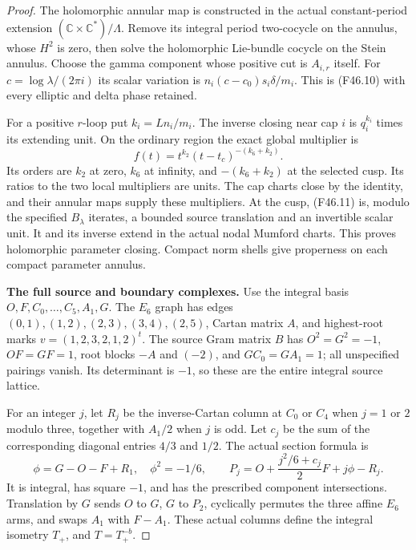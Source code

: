 \begin{proof}
The holomorphic annular map is constructed in the actual
constant-period extension $(\mathbb C\times\mathbb C^*)/\Lambda$.
Remove its integral period two-cocycle on the annulus, whose
$H^2$ is zero, then solve the holomorphic Lie-bundle cocycle
on the Stein annulus. Choose the gamma component whose positive
cut is $A_{i,r}$ itself. For $c=\log\lambda/(2\pi i)$ its scalar
variation is $n_i(c-c_0)s_i\delta/m_i$. This is (F46.10) with
every elliptic and delta phase retained.

For a positive $r$-loop put $k_i=Ln_i/m_i$. The inverse closing
near cap $i$ is $q_i^{k_i}$ times its extending unit. On the
ordinary region the exact global multiplier is
\[
                  f(t)=t^{k_2}(t-t_c)^{-(k_6+k_2)}.              \tag{F46.11}
\]
Its orders are $k_2$ at zero, $k_6$ at infinity, and
$-(k_6+k_2)$ at the selected cusp. Its ratios to the two local
multipliers are units. The cap charts close by the identity,
and their annular maps supply these multipliers. At the cusp,
(F46.11) is, modulo the specified $B_\lambda$ iterates, a bounded
source translation and an invertible scalar unit. It and its
inverse extend in the actual nodal Mumford charts. This proves
holomorphic parameter closing. Compact norm shells give
properness on each compact parameter annulus.

\par\medskip\noindent\textbf{The full source and boundary complexes.}
Use the integral basis $O,F,C_0,\ldots,C_5,A_1,G$.
The $E_6$ graph has edges
$(0,1),(1,2),(2,3),(3,4),(2,5)$, Cartan matrix $A$, and
highest-root marks $v=(1,2,3,2,1,2)^t$.
The source Gram matrix $B$ has $O^2=G^2=-1$, $OF=GF=1$,
root blocks $-A$ and $(-2)$, and $GC_0=GA_1=1$;
all unspecified pairings vanish. Its determinant is $-1$,
so these are the entire integral source lattice.

For an integer $j$, let $R_j$ be the inverse-Cartan column at
$C_0$ or $C_4$ when $j=1$ or $2$ modulo three, together
with $A_1/2$ when $j$ is odd. Let $c_j$ be the sum of the
corresponding diagonal entries $4/3$ and $1/2$.
The actual section formula is
\[
 \phi=G-O-F+R_1,\quad \phi^2=-1/6,\qquad
 P_j=O+\frac{j^2/6+c_j}{2}F+j\phi-R_j.                          \tag{F46.12}
\]
It is integral, has square $-1$, and has the prescribed component
intersections. Translation by $G$ sends $O$ to $G$, $G$ to
$P_2$, cyclically permutes the three affine $E_6$ arms, and
swaps $A_1$ with $F-A_1$. These actual columns define the
integral isometry $T_+$, and $T=T_+^{-b}$.


\end{proof}
